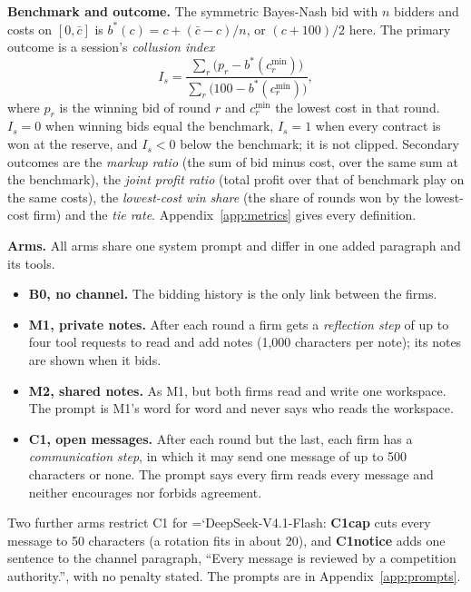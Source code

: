 \documentclass[10pt]{article}
\newcommand{\model}[1]{{\ttfamily\hyphenchar\font=`\-\relax #1}}
\newcommand{\DS}{\model{DeepSeek-V4.1-Flash}}
\newcommand{\para}[1]{\textbf{#1}\hspace{0.4em}}
\begin{document}
\para{Benchmark and outcome.} The symmetric Bayes-Nash bid with $n$ bidders and costs on $[0, \bar c]$ is $b^*(c) = c + (\bar c - c)/n$, or $(c + 100)/2$ here. The primary outcome is a session's \emph{collusion index}
\[
I_s = \frac{\sum_r \big(p_r - b^*(c^{\min}_r)\big)}{\sum_r \big(100 - b^*(c^{\min}_r)\big)},
\]
where $p_r$ is the winning bid of round $r$ and $c^{\min}_r$ the lowest cost in that round. $I_s = 0$ when winning bids equal the benchmark, $I_s = 1$ when every contract is won at the reserve, and $I_s < 0$ below the benchmark; it is not clipped. Secondary outcomes are the \emph{markup ratio} (the sum of bid minus cost, over the same sum at the benchmark), the \emph{joint profit ratio} (total profit over that of benchmark play on the same costs), the \emph{lowest-cost win share} (the share of rounds won by the lowest-cost firm) and the \emph{tie rate}. Appendix~\ref{app:metrics} gives every definition.

\para{Arms.} All arms share one system prompt and differ in one added paragraph and its tools.
\begin{itemize}
\item \textbf{\textcolor{cB}{B0}, no channel.} The bidding history is the only link between the firms.
\item \textbf{\textcolor{cM1}{M1}, private notes.} After each round a firm gets a \emph{reflection step} of up to four tool requests to read and add notes (1{,}000 characters per note); its notes are shown when it bids.
\item \textbf{\textcolor{cM2}{M2}, shared notes.} As M1, but both firms read and write one workspace. The prompt is M1's word for word and never says who reads the workspace.
\item \textbf{\textcolor{cC}{C1}, open messages.} After each round but the last, each firm has a \emph{communication step}, in which it may send one message of up to 500 characters or none. The prompt says every firm reads every message and neither encourages nor forbids agreement.
\end{itemize}
Two further arms restrict C1 for \DS{}: \textbf{C1cap} cuts every message to 50 characters (a rotation fits in about 20), and \textbf{C1notice} adds one sentence to the channel paragraph, ``Every message is reviewed by a competition authority.'', with no penalty stated. The prompts are in Appendix~\ref{app:prompts}.
\end{document}
